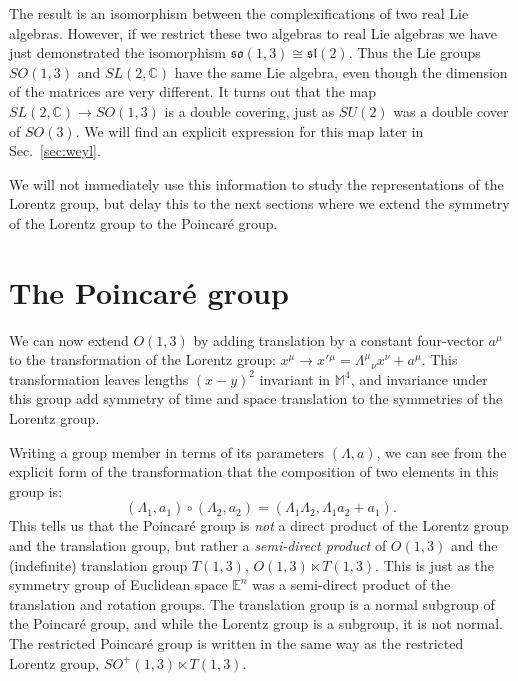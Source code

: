 \documentclass[notes.tex]{subfiles}
\begin{document}
The result is an isomorphism between the complexifications of two real Lie algebras. However, if we restrict these two algebras to real Lie algebras we have just demonstrated the isomorphism $\mathfrak{so}(1,3)\cong \mathfrak{sl}(2)$. Thus the Lie groups $SO(1,3)$ and $SL(2,\mathbb C)$ have the same Lie algebra, even though the dimension of the matrices are very different. It turns out that the map $SL(2,\mathbb C)\to SO(1,3)$ is a double covering, just as $SU(2)$ was a double cover of $SO(3)$. We will find an explicit expression for this map later in Sec.~\ref{sec:weyl}.

We will not immediately use this information to study the representations of the Lorentz group, but delay this to the next sections where we extend the symmetry of the Lorentz group to the Poincaré group. 


\section{The Poincaré group}
\label{sec:Poincare_group}
We can now extend $O(1,3)$ by adding translation by a constant four-vector $a^\mu$ to the transformation of the Lorentz group:  $x^\mu \to x'{}^\mu = \Lambda^\mu{}_\nu x^\nu + a^\mu$. This transformation leaves lengths $(x-y)^2$ invariant in $\mathbb{M}^4$, and invariance under this group add symmetry of time and space translation to the symmetries of the Lorentz group.

Writing a group member in terms of its parameters $(\Lambda, a)$, we can see  from the explicit form of the transformation that the composition of two elements in this group is:
\[(\Lambda_1, a_1)\circ(\Lambda_2, a_2) = (\Lambda_1\Lambda_2, \Lambda_1a_2 + a_1).\]
This tells us that the Poincar\'{e} group is {\it not} a direct product of the Lorentz group and the translation group, but rather a {\it semi-direct product} of $O(1,3)$ and the (indefinite) translation group $T(1,3)$, $O(1,3) \ltimes T(1,3)$. This is just as the symmetry group of Euclidean space $\mathbb E^n$ was a semi-direct product of the translation and rotation groups. The translation group is a normal subgroup of the Poincaré group, and while the Lorentz group is a subgroup, it is not normal. The restricted Poincaré group is written in the same way as the restricted Lorentz group, $SO^+(1,3) \ltimes T(1,3)$.
\end{document}
